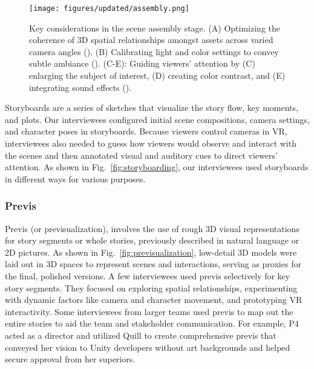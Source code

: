 \begin{figure*}[!tb]
    \centering
    \texttt{[image: figures/updated/assembly.png]}
    \caption{Key considerations in the scene assembly stage. (A) Optimizing the coherence of 3D spatial relationships amongst assets across varied camera angles (). (B) Calibrating light and color settings to convey subtle ambiance (). (C-E): Guiding viewers' attention by (C) enlarging the subject of interest, (D) creating color contrast, and (E) integrating sound effects ().} 
    \label{fig:scene_assembly}
\end{figure*}


Storyboards are a series of sketches that visualize the story flow, key moments, and plots.  Our interviewees configured initial scene compositions, camera settings, and character poses in storyboards. Because viewers control cameras in VR, interviewees also needed to guess how viewers would observe and interact with the scenes and then annotated visual and auditory cues to direct viewers' attention. As shown in Fig.~\ref{fig:storyboarding}, our interviewees used storyboards in different ways for various purposes.

\subsubsection{Previs}
\label{sec:previs}
Previs (or previsualization), involves the use of rough 3D visual representations for story segments or whole stories, previously described in natural language or 2D pictures. 
As shown in Fig.~\ref{fig:previsualization}, 
low-detail 3D models were laid out in 3D spaces to represent scenes and interactions, serving as proxies for the final, polished versions. 
A few interviewees used previs selectively for key story segments. They focused on exploring spatial relationships, experimenting with dynamic factors like camera and character movement, and prototyping VR interactivity. 
Some interviewees from larger teams used previs to map out the entire stories to aid the team and stakeholder communication.
For example, P4 acted as a director and utilized Quill to create comprehensive previs that conveyed her vision to Unity developers without art backgrounds and helped secure approval from her superiors.

